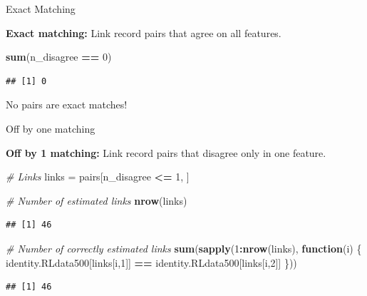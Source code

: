 \documentclass[
  ignorenonframetext,
]{beamer}
\newenvironment{Shaded}{\begin{snugshade}}{\end{snugshade}}
\newcommand{\CommentTok}[1]{\textcolor[rgb]{0.56,0.35,0.01}{\textit{#1}}}
\newcommand{\ControlFlowTok}[1]{\textcolor[rgb]{0.13,0.29,0.53}{\textbf{#1}}}
\newcommand{\DecValTok}[1]{\textcolor[rgb]{0.00,0.00,0.81}{#1}}
\newcommand{\KeywordTok}[1]{\textcolor[rgb]{0.13,0.29,0.53}{\textbf{#1}}}
\newcommand{\NormalTok}[1]{#1}
\newcommand{\OperatorTok}[1]{\textcolor[rgb]{0.81,0.36,0.00}{\textbf{#1}}}
\newcommand{\StringTok}[1]{\textcolor[rgb]{0.31,0.60,0.02}{#1}}
\begin{document}
\begin{frame}[fragile]{Exact Matching}
\protect\hypertarget{exact-matching}{}

\textbf{Exact matching:} Link record pairs that agree on all features.

\vspace*{1em}

\begin{Shaded}
\begin{Highlighting}[]
\KeywordTok{sum}\NormalTok{(n_disagree }\OperatorTok{==}\StringTok{ }\DecValTok{0}\NormalTok{)}
\end{Highlighting}
\end{Shaded}

\begin{verbatim}
## [1] 0
\end{verbatim}

\vspace*{1em}

No pairs are exact matches!

\end{frame}

\begin{frame}[fragile]{Off by one matching}
\protect\hypertarget{off-by-one-matching}{}

\textbf{Off by 1 matching:} Link record pairs that disagree only in one
feature.

\vspace*{1em}
\footnotesize

\begin{Shaded}
\begin{Highlighting}[]
\CommentTok{# Links}
\NormalTok{links =}\StringTok{ }\NormalTok{pairs[n_disagree }\OperatorTok{<=}\StringTok{ }\DecValTok{1}\NormalTok{, ]}

\CommentTok{# Number of estimated links}
\KeywordTok{nrow}\NormalTok{(links)}
\end{Highlighting}
\end{Shaded}

\begin{verbatim}
## [1] 46
\end{verbatim}

\begin{Shaded}
\begin{Highlighting}[]
\CommentTok{# Number of correctly estimated links}
\KeywordTok{sum}\NormalTok{(}\KeywordTok{sapply}\NormalTok{(}\DecValTok{1}\OperatorTok{:}\KeywordTok{nrow}\NormalTok{(links), }\ControlFlowTok{function}\NormalTok{(i) \{}
\NormalTok{  identity.RLdata500[links[i,}\DecValTok{1}\NormalTok{]] }\OperatorTok{==}\StringTok{ }
\StringTok{    }\NormalTok{identity.RLdata500[links[i,}\DecValTok{2}\NormalTok{]]}
\NormalTok{\}))}
\end{Highlighting}
\end{Shaded}

\begin{verbatim}
## [1] 46
\end{verbatim}

\end{frame}
\end{document}
